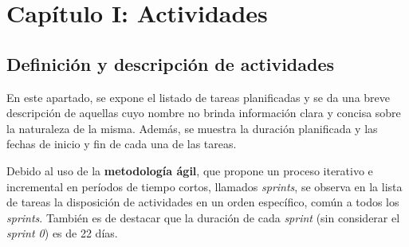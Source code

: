 \section{Capítulo I: Actividades}
\subsection{Definición y descripción de actividades}
En este apartado, se expone el listado de tareas planificadas y se da una breve descripción de aquellas cuyo nombre no brinda información clara y concisa sobre la naturaleza de la misma.
Además, se muestra la duración planificada y las fechas de inicio y fin de cada una de las tareas.

Debido al uso de la \textbf{metodología ágil}, que propone un proceso iterativo e incremental en períodos de tiempo cortos, llamados \textit{sprints}, se observa en la lista de tareas la disposición de actividades en un orden específico, común a todos los \textit{sprints}.
También es de destacar que la duración de cada \textit{sprint} (sin considerar el \textit{sprint 0}) es de 22 días.

